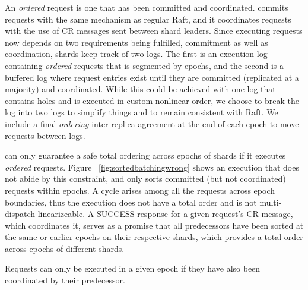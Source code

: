 An \textit{ordered} request is one that has been committed and coordinated. \md commits requests with the same mechanism as regular Raft, and it coordinates requests with the use of CR messages sent between shard leaders. Since executing requests now depends on two requirements being fulfilled, commitment as well as coordination, shards keep track of two logs. The first is an execution log containing \textit{ordered} requests that is segmented by epochs, and the second is a buffered log where request entries exist until they are committed (replicated at a majority) and coordinated. While this could be achieved with one log that contains holes and is executed in custom nonlinear order, we choose to break the log into two logs to simplify things and to remain consistent with Raft. We include a final \textit{ordering} inter-replica agreement at the end of each epoch to move requests between logs.

\md can only guarantee a safe total ordering across epochs of shards if it executes \textit{ordered} requests. Figure ~\ref{fig:sortedbatchingwrong} shows an execution that does not abide by this constraint, and only sorts committed (but not coordinated) requests within epochs. A cycle arises among all the requests across epoch boundaries, thus the execution does not have a total order and is not multi-dispatch linearizeable. A SUCCESS response for a given request's CR message, which coordinates it, serves as a promise that all predecessors have been sorted at the same or earlier epochs on their respective shards, which provides a total order across epochs of different shards.

Requests can only be executed in a given epoch if they have also been coordinated by their predecessor.



